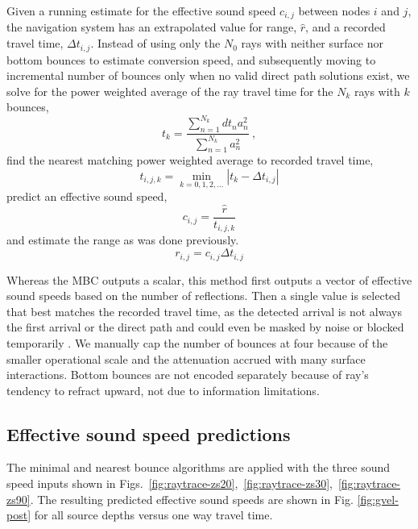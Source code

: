 Given a running estimate for the effective sound speed $c_{i,j}$ between nodes $i$ and $j$, the navigation system has an extrapolated value for range, $\hat{r}$, and a recorded travel time, $\Delta t_{i,j}$.
Instead of using only the $N_0$ rays with neither surface nor bottom bounces to estimate conversion speed, and subsequently moving to incremental number of bounces only when no valid direct path solutions exist, we solve for the power weighted average of the ray travel time for the $N_k$ rays with $k$ bounces,
\begin{equation}
t_k = \frac{\sum_{n=1}^{N_{k}} dt_{n}a_{n}^{2}}{\sum_{n=1}^{N_{k}} a_{n}^{2}} ~, 
\end{equation}
find the nearest matching power weighted average to recorded travel time,
\begin{equation}
t_{i,j,k} = \min_{k=0,1,2,...} \left| t_k - \Delta t_{i,j} \right|
\end{equation}
predict an effective sound speed,
\begin{equation}
c_{i,j} = \dfrac{\hat{r}}{t_{i,j,k}}
\end{equation}
and estimate the range as was done previously.
\begin{equation}
r_{i,j} = c_{i,j}\Delta t_{i,j}
\end{equation}

Whereas the MBC outputs a scalar, this method first outputs a vector of effective sound speeds based on the number of reflections.
Then a single value is selected that best matches the recorded travel time, as the detected arrival is not always the first arrival or the direct path and could even be masked by noise or blocked temporarily \citep{deffenbaugh_acoustic_1996}.
We manually cap the number of bounces at four because of the smaller operational scale and the attenuation accrued with many surface interactions.
Bottom bounces are not encoded separately because of ray's tendency to refract upward, not due to information limitations.

\subsection{Effective sound speed predictions}

The minimal and nearest bounce algorithms are applied with the three sound speed inputs shown in Figs.~\ref{fig:raytrace-zs20},~\ref{fig:raytrace-zs30},~\ref{fig:raytrace-zs90}.
The resulting predicted effective sound speeds are shown in Fig. \ref{fig:gvel-post} for all source depths versus one way travel time.

